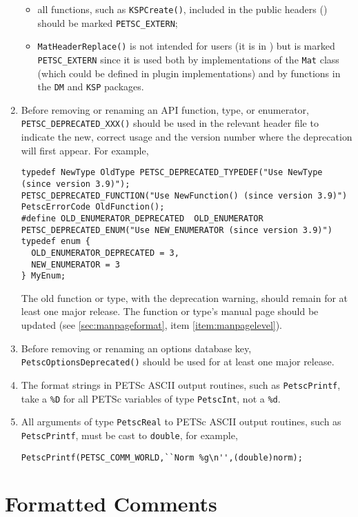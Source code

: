 \begin{enumerate}
\begin{itemize}
\item all functions, such as \lstinline{KSPCreate()}, included in the public headers () should be marked \lstinline{PETSC_EXTERN};
\item \lstinline{MatHeaderReplace()} is not intended for users (it is in ) but is marked \lstinline{PETSC_EXTERN} since it is used both by implementations of the \lstinline{Mat} class (which could be defined in plugin implementations) and by functions in the \lstinline{DM} and \lstinline{KSP} packages.
\end{itemize}
\item Before removing or renaming an API function, type, or enumerator,
\lstinline{PETSC_DEPRECATED_XXX()} should be used in the relevant header file to indicate the new, correct usage and the version number where the deprecation will first appear. For example,
\begin{lstlisting}
typedef NewType OldType PETSC_DEPRECATED_TYPEDEF("Use NewType (since version 3.9)");
PETSC_DEPRECATED_FUNCTION("Use NewFunction() (since version 3.9)") PetscErrorCode OldFunction();
#define OLD_ENUMERATOR_DEPRECATED  OLD_ENUMERATOR PETSC_DEPRECATED_ENUM("Use NEW_ENUMERATOR (since version 3.9)")
typedef enum {
  OLD_ENUMERATOR_DEPRECATED = 3,
  NEW_ENUMERATOR = 3
} MyEnum;
\end{lstlisting}
The old function or type, with the deprecation warning, should remain for at least one major release. The function or type's manual page should be updated (see \ref{sec:manpageformat}, item \ref{item:manpagelevel}).
\item Before removing or renaming an options database key, \lstinline{PetscOptionsDeprecated()} should be used for at least one major release.
\item The format strings in PETSc ASCII output routines, such as \lstinline{PetscPrintf}, take a \lstinline{%D} for all PETSc variables of
    type \lstinline{PetscInt}, not a \lstinline{%d}.
\item All arguments of type \lstinline{PetscReal} to PETSc ASCII output routines, such as \lstinline{PetscPrintf}, must be cast to \lstinline{double}, for example,
\begin{lstlisting}
PetscPrintf(PETSC_COMM_WORLD,``Norm %g\n'',(double)norm);
\end{lstlisting}
\end{enumerate}

\section{Formatted Comments}

